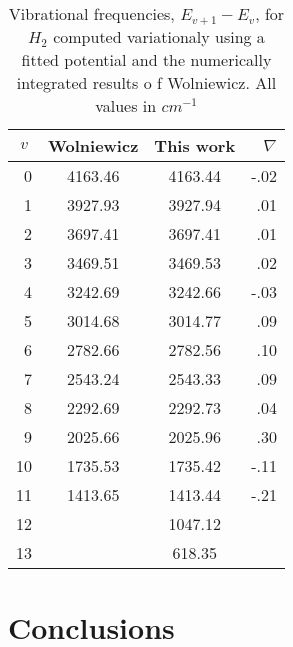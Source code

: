 \documentclass[12pt,thmsa]{article}
\begin{document}
\begin{table}[tbp] \centering%
%
\begin{tabular}{cccr}
\hline\hline
$v$ & Wolniewicz & This work & $\nabla $ \\ \hline
\multicolumn{1}{r}{0} & 4163.46 & 4163.44 & -.02 \\ 
\multicolumn{1}{r}{1} & 3927.93 & 3927.94 & .01 \\ 
\multicolumn{1}{r}{2} & 3697.41 & 3697.41 & \TEXTsymbol{<}.01 \\ 
\multicolumn{1}{r}{3} & 3469.51 & 3469.53 & .02 \\ 
\multicolumn{1}{r}{4} & 3242.69 & 3242.66 & -.03 \\ 
\multicolumn{1}{r}{5} & 3014.68 & 3014.77 & .09 \\ 
\multicolumn{1}{r}{6} & 2782.66 & 2782.56 & .10 \\ 
\multicolumn{1}{r}{7} & 2543.24 & 2543.33 & .09 \\ 
\multicolumn{1}{r}{8} & 2292.69 & 2292.73 & .04 \\ 
\multicolumn{1}{r}{9} & 2025.66 & 2025.96 & .30 \\ 
\multicolumn{1}{r}{10} & 1735.53 & 1735.42 & -.11 \\ 
\multicolumn{1}{r}{11} & 1413.65 & 1413.44 & -.21 \\ 
\multicolumn{1}{r}{12} &  & 1047.12 &  \\ 
\multicolumn{1}{r}{13} &  & 618.35 &  \\ \hline
\end{tabular}
\caption{Vibrational frequencies, $ E_{v+1}-E_{v }$,  for $ H_2 $ computed variationaly
 using a fitted potential  and the numerically integrated results o f Wolniewicz.
 All values in $ cm^{-1} $ } \label{freqtab}%
\end{table}%
%

\section{Conclusions}
\end{document}
